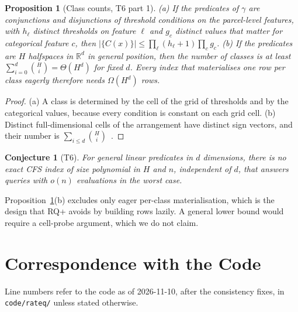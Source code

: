 \documentclass[11pt]{article}
\newtheorem{proposition}[theorem]{Proposition}
\newtheorem{conjecture}[theorem]{Conjecture}
\theoremstyle{definition}
\theoremstyle{remark}
\newcommand{\code}[1]{\texttt{#1}}
\begin{document}
\begin{proposition}[Class counts, T6 part 1]\label{prop:T6a}
(a) If the predicates of $\gamma$ are conjunctions and disjunctions of threshold conditions
on the parcel-level features, with $h_\ell$ distinct thresholds on feature $\ell$ and $g_c$
distinct values that matter for categorical feature $c$, then
$|\{C(x)\}|\le\prod_\ell(h_\ell+1)\prod_cg_c$.
(b) If the predicates are $H$ halfspaces in $\mathbb R^d$ in general position, then the
number of classes is at least $\sum_{i=0}^{d}\binom Hi=\Theta(H^d)$ for fixed $d$. Every index that
materialises one row per class eagerly therefore needs $\Omega(H^d)$ rows.
\end{proposition}
\begin{proof}
(a) A class is determined by the cell of the grid of thresholds and by the categorical
values, because every condition is constant on each grid cell. (b) Distinct full-dimensional
cells of the arrangement have distinct sign vectors, and their number is
$\sum_{i\le d}\binom Hi$~\cite{buck1943partition,zaslavsky1975facing}.
\end{proof}

\begin{conjecture}[T6]\label{conj:T6}
For general linear predicates in $d$ dimensions, there is no exact CFS index of size
polynomial in $H$ and $n$, independent of $d$, that answers queries with
$o(n)$ evaluations in the worst case.
\end{conjecture}
Proposition~\ref{prop:T6a}(b) excludes only eager per-class materialisation, which is the
design that RQ+ avoids by building rows lazily. A general lower bound would require a
cell-probe argument, which we do not claim.

\appendix
\section{Correspondence with the Code}\label{app:code}

Line numbers refer to the code as of 2026-11-10, after the consistency fixes, in
\code{code/rateq/} unless stated otherwise.
\end{document}
